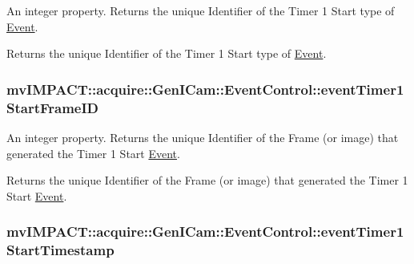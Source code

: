 An integer property. Returns the unique Identifier of the Timer 1 Start type of \hyperlink{classmv_i_m_p_a_c_t_1_1acquire_1_1_event}{Event}. 

Returns the unique Identifier of the Timer 1 Start type of \hyperlink{classmv_i_m_p_a_c_t_1_1acquire_1_1_event}{Event}. \hypertarget{classmv_i_m_p_a_c_t_1_1acquire_1_1_gen_i_cam_1_1_event_control_a50a53d719e9803324c751e2dc0ab36e5}{
\subsubsection[{event\+Timer1\+Start\+Frame\+I\+D}]{ mv\+I\+M\+P\+A\+C\+T\+::acquire\+::\+Gen\+I\+Cam\+::\+Event\+Control\+::event\+Timer1\+Start\+Frame\+I\+D}}\label{classmv_i_m_p_a_c_t_1_1acquire_1_1_gen_i_cam_1_1_event_control_a50a53d719e9803324c751e2dc0ab36e5}


An integer property. Returns the unique Identifier of the Frame (or image) that generated the Timer 1 Start \hyperlink{classmv_i_m_p_a_c_t_1_1acquire_1_1_event}{Event}. 

Returns the unique Identifier of the Frame (or image) that generated the Timer 1 Start \hyperlink{classmv_i_m_p_a_c_t_1_1acquire_1_1_event}{Event}. \hypertarget{classmv_i_m_p_a_c_t_1_1acquire_1_1_gen_i_cam_1_1_event_control_a970e53dbe83e13b2b4c77333c2c6e790}{
\subsubsection[{event\+Timer1\+Start\+Timestamp}]{ mv\+I\+M\+P\+A\+C\+T\+::acquire\+::\+Gen\+I\+Cam\+::\+Event\+Control\+::event\+Timer1\+Start\+Timestamp}}\label{classmv_i_m_p_a_c_t_1_1acquire_1_1_gen_i_cam_1_1_event_control_a970e53dbe83e13b2b4c77333c2c6e790}


